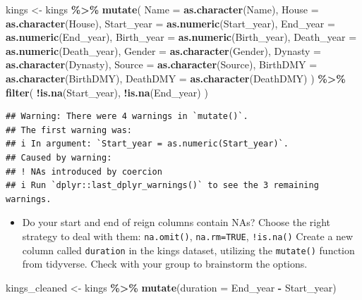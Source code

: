\documentclass[
]{article}
\newenvironment{Shaded}{\begin{snugshade}}{\end{snugshade}}
\newcommand{\AttributeTok}[1]{\textcolor[rgb]{0.13,0.29,0.53}{#1}}
\newcommand{\FunctionTok}[1]{\textcolor[rgb]{0.13,0.29,0.53}{\textbf{#1}}}
\newcommand{\NormalTok}[1]{#1}
\newcommand{\OtherTok}[1]{\textcolor[rgb]{0.56,0.35,0.01}{#1}}
\newcommand{\SpecialCharTok}[1]{\textcolor[rgb]{0.81,0.36,0.00}{\textbf{#1}}}
\providecommand{\tightlist}{%
  \setlength{\itemsep}{0pt}\setlength{\parskip}{0pt}}
\begin{document}
\begin{Shaded}
\begin{Highlighting}[]
\NormalTok{kings }\OtherTok{\textless{}{-}}\NormalTok{ kings }\SpecialCharTok{\%\textgreater{}\%}
  \FunctionTok{mutate}\NormalTok{(}
    \AttributeTok{Name =} \FunctionTok{as.character}\NormalTok{(Name),}
    \AttributeTok{House =} \FunctionTok{as.character}\NormalTok{(House),}
    \AttributeTok{Start\_year =} \FunctionTok{as.numeric}\NormalTok{(Start\_year),}
    \AttributeTok{End\_year =} \FunctionTok{as.numeric}\NormalTok{(End\_year),}
    \AttributeTok{Birth\_year =} \FunctionTok{as.numeric}\NormalTok{(Birth\_year),}
    \AttributeTok{Death\_year =} \FunctionTok{as.numeric}\NormalTok{(Death\_year),}
    \AttributeTok{Gender =} \FunctionTok{as.character}\NormalTok{(Gender),       }
    \AttributeTok{Dynasty =} \FunctionTok{as.character}\NormalTok{(Dynasty),}
    \AttributeTok{Source =} \FunctionTok{as.character}\NormalTok{(Source),}
    \AttributeTok{BirthDMY =} \FunctionTok{as.character}\NormalTok{(BirthDMY),   }
    \AttributeTok{DeathDMY =} \FunctionTok{as.character}\NormalTok{(DeathDMY)}
\NormalTok{  ) }\SpecialCharTok{\%\textgreater{}\%}
  \FunctionTok{filter}\NormalTok{(}
    \SpecialCharTok{!}\FunctionTok{is.na}\NormalTok{(Start\_year),}
    \SpecialCharTok{!}\FunctionTok{is.na}\NormalTok{(End\_year)}
\NormalTok{  )}
\end{Highlighting}
\end{Shaded}

\begin{verbatim}
## Warning: There were 4 warnings in `mutate()`.
## The first warning was:
## i In argument: `Start_year = as.numeric(Start_year)`.
## Caused by warning:
## ! NAs introduced by coercion
## i Run `dplyr::last_dplyr_warnings()` to see the 3 remaining warnings.
\end{verbatim}

\begin{itemize}
\tightlist
\item
  Do your start and end of reign columns contain NAs? Choose the right
  strategy to deal with them: \texttt{na.omit()}, \texttt{na.rm=TRUE},
  \texttt{!is.na()} Create a new column called \texttt{duration} in the
  kings dataset, utilizing the \texttt{mutate()} function from
  tidyverse. Check with your group to brainstorm the options.
\end{itemize}

\begin{Shaded}
\begin{Highlighting}[]
\NormalTok{kings\_cleaned }\OtherTok{\textless{}{-}}\NormalTok{ kings }\SpecialCharTok{\%\textgreater{}\%}
  \FunctionTok{mutate}\NormalTok{(}\AttributeTok{duration =}\NormalTok{ End\_year }\SpecialCharTok{{-}}\NormalTok{ Start\_year) }
\end{Highlighting}
\end{Shaded}
\end{document}
